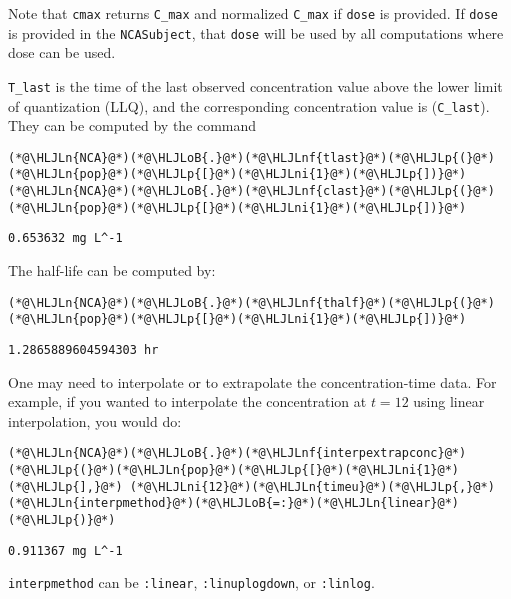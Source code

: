 \documentclass[12pt,a4paper]{article}
\newcommand{\HLJLn}[1]{#1}
\newcommand{\HLJLnf}[1]{\textcolor[RGB]{66,102,213}{#1}}
\newcommand{\HLJLni}[1]{\textcolor[RGB]{59,151,46}{#1}}
\newcommand{\HLJLoB}[1]{\textcolor[RGB]{102,102,102}{\textbf{#1}}}
\newcommand{\HLJLp}[1]{#1}
\begin{document}
Note that \texttt{cmax} returns \texttt{C\_max} and normalized \texttt{C\_max} if \texttt{dose} is provided. If \texttt{dose} is provided in the \texttt{NCASubject}, that \texttt{dose} will be used by all computations where dose can be used.

\texttt{T\_last} is the time of the last observed concentration value above the lower limit of quantization (LLQ), and the corresponding concentration value is (\texttt{C\_last}). They can be computed by the command


\begin{lstlisting}
(*@\HLJLn{NCA}@*)(*@\HLJLoB{.}@*)(*@\HLJLnf{tlast}@*)(*@\HLJLp{(}@*)(*@\HLJLn{pop}@*)(*@\HLJLp{[}@*)(*@\HLJLni{1}@*)(*@\HLJLp{])}@*)
(*@\HLJLn{NCA}@*)(*@\HLJLoB{.}@*)(*@\HLJLnf{clast}@*)(*@\HLJLp{(}@*)(*@\HLJLn{pop}@*)(*@\HLJLp{[}@*)(*@\HLJLni{1}@*)(*@\HLJLp{])}@*)
\end{lstlisting}

\begin{lstlisting}
0.653632 mg L^-1
\end{lstlisting}


The half-life can be computed by:


\begin{lstlisting}
(*@\HLJLn{NCA}@*)(*@\HLJLoB{.}@*)(*@\HLJLnf{thalf}@*)(*@\HLJLp{(}@*)(*@\HLJLn{pop}@*)(*@\HLJLp{[}@*)(*@\HLJLni{1}@*)(*@\HLJLp{])}@*)
\end{lstlisting}

\begin{lstlisting}
1.2865889604594303 hr
\end{lstlisting}


One may need to interpolate or to extrapolate the concentration-time data. For example, if you wanted to interpolate the concentration at $t=12$ using linear interpolation, you would do:


\begin{lstlisting}
(*@\HLJLn{NCA}@*)(*@\HLJLoB{.}@*)(*@\HLJLnf{interpextrapconc}@*)(*@\HLJLp{(}@*)(*@\HLJLn{pop}@*)(*@\HLJLp{[}@*)(*@\HLJLni{1}@*)(*@\HLJLp{],}@*) (*@\HLJLni{12}@*)(*@\HLJLn{timeu}@*)(*@\HLJLp{,}@*) (*@\HLJLn{interpmethod}@*)(*@\HLJLoB{=:}@*)(*@\HLJLn{linear}@*)(*@\HLJLp{)}@*)
\end{lstlisting}

\begin{lstlisting}
0.911367 mg L^-1
\end{lstlisting}


\texttt{interpmethod} can be \texttt{:linear}, \texttt{:linuplogdown}, or \texttt{:linlog}.
\end{document}
